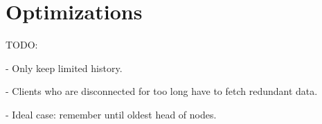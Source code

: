 
\section{Optimizations}

TODO:

- Only keep limited history.

- Clients who are disconnected for too long have to fetch redundant data.

- Ideal case: remember until oldest head of nodes.
